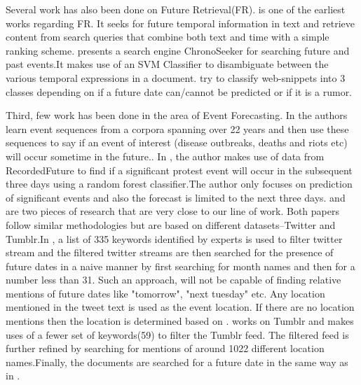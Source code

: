 Several work has also been done on Future Retrieval(FR).\cite{baeza2005searching} is one of the earliest works regarding FR. It seeks for future temporal information in text and retrieve content from search queries that combine both text and time with a simple ranking scheme. \cite{Kawai:2010:CSE} presents a search engine ChronoSeeker for searching future and past events.It makes use of an SVM Classifier to disambiguate between the various temporal expressions in a document.\cite{dias2011future} try to classify web-snippets into 3 classes depending on if a future date can/cannot be predicted or if it is a rumor.

Third, few work has been done in the area of Event Forecasting. In \cite{Radinsky:2013:MWP} the authors learn event sequences from a corpora spanning over 22 years and then use these sequences to say if an event of interest (disease outbreaks, deaths and riots etc) will occur sometime in the future.\iffalse They only predict if an event of interest will happen in the future given the sequence of events seen but do not predict when/where(city level resolution) that event will happen \fi. In \cite{nathankallus}, the author makes use of data from RecordedFuture\cite{recordedFuture} to find if a  significant protest event will occur in the subsequent three days using a random forest classifier.The author only focuses on prediction of significant events and also the forecast is limited to the next three days.\cite{compton2013detecting} and \cite{xu2014civil} are two pieces of research  that are very close to our line of work. Both papers follow similar methodologies but are based on different datasets--Twitter and Tumblr.In \cite{compton2013detecting}, a list of 335 keywords identified by experts is used to filter twitter stream and the filtered twitter streams are then searched for the presence of future dates in a naive manner by first searching for month names and then for a number less than 31. Such an approach, will not be capable of finding relative mentions of future dates like "tomorrow", "next tuesday" etc. Any location mentioned in the tweet text is used as the event location. If there are no location mentions then the location is determined based on \cite{hrlgeocoder}.\cite{xu2014civil} works on Tumblr and makes uses of a fewer set of keywords(59) to filter the Tumblr feed. The filtered feed is further refined by searching for mentions of around 1022 different location names.Finally, the documents are searched for a future date in the same way as in \cite{compton2013detecting}.


